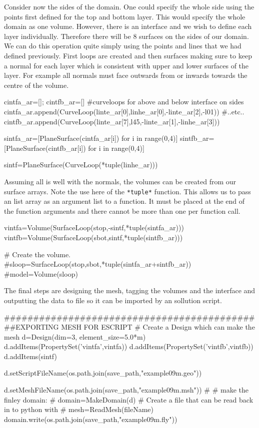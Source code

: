 Consider now the sides of the domain. One could specify the whole side using the
points first defined for the top and bottom layer. This would specify the whole
domain as one volume. However, there is an interface and we wish to define each
layer individually. Therefore there will be 8 surfaces on the sides of our
domain. We can do this operation quite simply using the points and lines that we
had defined previously. First loops are created and then surfaces making sure to
keep a normal for each layer which is consistent with upper and lower surfaces
of the layer. For example all normals must face outwards from or inwards towards
 the centre of the volume.
\begin{python}
cintfa_ar=[]; cintfb_ar=[] #curveloops for above and below interface on sides
cintfa_ar.append(CurveLoop(linte_ar[0],linhe_ar[0],-linte_ar[2],-l01))
#..etc..
cintfb_ar.append(CurveLoop(linte_ar[7],l45,-linte_ar[1],-linhe_ar[3]))

sintfa_ar=[PlaneSurface(cintfa_ar[i]) for i in range(0,4)]
sintfb_ar=[PlaneSurface(cintfb_ar[i]) for i in range(0,4)]

sintf=PlaneSurface(CurveLoop(*tuple(linhe_ar)))
\end{python}
Assuming all is well with the normals, the volumes can be created from our
surface arrays. Note the use here of the \verb!*tuple*! function. This allows us
to pass an list array as an argument list to a function. It must be placed at
the end of the function arguments and there cannot be more than one per function
call.
\begin{python}
vintfa=Volume(SurfaceLoop(stop,-sintf,*tuple(sintfa_ar)))
vintfb=Volume(SurfaceLoop(sbot,sintf,*tuple(sintfb_ar)))

# Create the volume.
#sloop=SurfaceLoop(stop,sbot,*tuple(sintfa_ar+sintfb_ar))
#model=Volume(sloop)
\end{python}
The final steps are designing the mesh, tagging the volumes and the interface
and outputting the data to file so it can be imported by an \esc sollution
script.
\begin{python}
#############################################EXPORTING MESH FOR ESCRIPT
# Create a Design which can make the mesh
d=Design(dim=3, element_size=5.0*m)
d.addItems(PropertySet('vintfa',vintfa))
d.addItems(PropertySet('vintfb',vintfb))
d.addItems(sintf)

d.setScriptFileName(os.path.join(save_path,"example09m.geo"))

d.setMeshFileName(os.path.join(save_path,"example09m.msh"))
#
#  make the finley domain:
#
domain=MakeDomain(d)
# Create a file that can be read back in to python with
# mesh=ReadMesh(fileName)
domain.write(os.path.join(save_path,"example09m.fly"))
\end{python}


